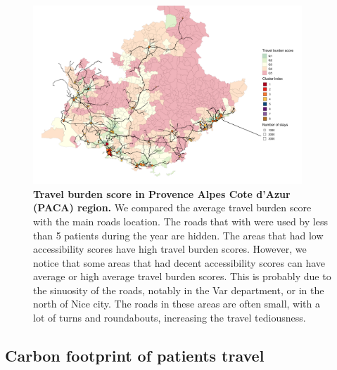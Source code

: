 \begin{figure}[h!]
    \includegraphics[width=0.9\textwidth]{images/routes/fig7.png}
    \centering
    \caption{
        \textbf{Travel burden score in Provence Alpes Cote d'Azur (PACA) region.}
        We compared the average travel burden score with the main roads
        location. The roads that with were used by less than 5 patients during
        the year are hidden. The areas that had low accessibility scores have
        high travel burden scores. However, we notice that some areas that had decent
        accessibility scores can have average or high average travel burden
        scores. This is probably due to the sinuosity of the roads, notably in
        the Var department, or in the north of Nice city. The roads in these
        areas are often small, with a lot of turns and roundabouts, increasing
        the travel tediousness. }
    \label{fig:travel-burden-paca}
\end{figure}

\subsection{Carbon footprint of patients travel}

